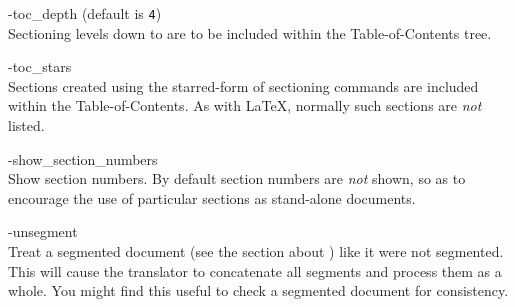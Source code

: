 \begin{htmllist}
%

\begin{changebar}
\item [ -toc\_depth  \Meta{num}\label{cs_tocdepth}]
 (default is \texttt{4})\\
Sectioning levels down to  are to be included
within the Table-of-Contents tree.%

%

\item [ -toc\_stars\label{cs_tocstars}]
\\
Sections created using the starred-form of sectioning commands
are included within the Table-of-Contents.
As with \LaTeX, normally such sections are \emph{not} listed.
%
\end{changebar}%

%

\item [ -show\_section\_numbers\label{cs_showsecnums}]
\\
Show section numbers. By default section numbers are \emph{not} shown,
so as to encourage the use of particular sections as stand-alone documents.
%
\begin{changebar}

\item [ -unsegment\label{cs_unsegment}]
\\
Treat a segmented document (see the section about ) like it were not segmented.
This will cause the translator to concatenate all segments and process
them as a whole.
You might find this useful to check a segmented document for
consistency.
\end{changebar}%
%
\end{htmllist}

